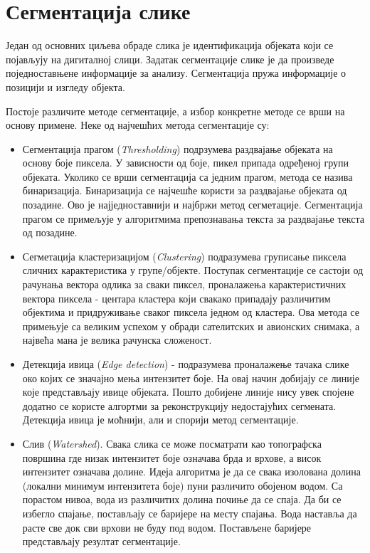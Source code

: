 \documentclass[12pt,a4paper,serbian,oneside]{book}
\begin{document}
\newpage

\section{Сегментација слике}

Један од основних циљева обраде слика је идентификација објеката који се појављују на дигиталној слици. Задатак сегментације слике је да произведе поједноставњене информације за анализу. Сегментација пружа информације о позицији и изгледу објекта.

Постоје различите методе сегментације, а избор конкретне методе се врши на основу примене. Неке од најчешћих метода сегментације су:

\begin{itemize}

  \item Сегментација прагом (\textit{Thresholding}) подрзумева раздвајање објеката на основу боје пиксела. У зависности од боје, пикел припада одређеној групи објеката. Уколико се врши сегментација са једним прагом, метода се назива бинаризација. Бинаризација се најчешће користи за раздвајање објеката од позадине. Ово је најједноставнији и најбржи метод сегметације. Сегментација прагом се примељује у алгоритмима препознавања текста за раздвајање текста од позадине.

  \item Сегметација кластеризацијом (\textit{Clustering}) подразумева груписање пиксела сличних карактеристика у групе/објекте. Поступак сегментације се састоји од рачунања вектора одлика за сваки пиксел, проналажења карактеристичних вектора пиксела - центара кластера који свакако припадају различитим објектима и придруживање сваког пиксела једном од кластера. Ова метода се примењује са великим успехом у обради сателитских и авионских снимака, а највећа мана је велика рачунска сложеност.
  
  \item Детекција ивица (\textit{Edge detection}) - подразумева проналажење тачака слике око којих се значајно мења интензитет боје. На овај начин добијају се линије које представљају ивице објеката. Пошто добијене линије нису увек спојене додатно се користе алгортми за реконструкцију недостајућих сегмената. Детекција ивица је моћнији, али и спорији метод сегментације.
  
  \item Слив (\textit{Watershed}). Свака слика се може посматрати као топографска површина где низак интензитет боје означава брда и врхове, а висок интензитет означава долине. Идеја алгоритма је да се свака изолована долина  (локални минимум интензитета боје) пуни различито обојеном водом. Са порастом нивоа, вода из различитих долина почиње да се спаја. Да би се избегло спајање, постављају се баријере на месту спајања.  Вода наставља да расте све док сви врхови не буду под водом. Постављене баријере представљају резултат сегментације.

\end{itemize}
 
\end{document}
